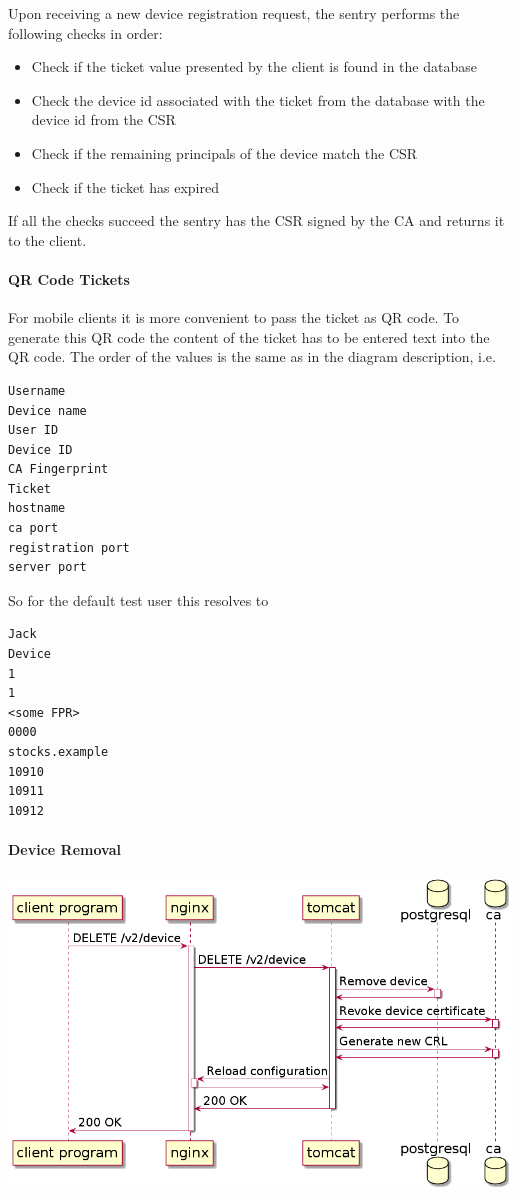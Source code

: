\documentclass{memoir}
\begin{document}
Upon receiving a new device registration request, the sentry performs the following checks in order:
\begin{itemize}
\item Check if the ticket value presented by the client is found in the database

\item Check the device id associated with the ticket from the database with the device id from the CSR

\item Check if the remaining principals of the device match the CSR

\item Check if the ticket has expired
\end{itemize}

If all the checks succeed the sentry has the CSR signed by the CA and returns it to the client.

\paragraph{QR Code Tickets}

For mobile clients it is more convenient to pass the ticket as QR code. To generate this QR code the content of the ticket has to be entered text into the QR code. The order of the values is the same as in the diagram description, i.e.

\begin{lstlisting}
Username
Device name
User ID
Device ID
CA Fingerprint
Ticket
hostname
ca port
registration port
server port
\end{lstlisting}

So for the default test user this resolves to

\begin{lstlisting}
Jack
Device
1
1
<some FPR>
0000
stocks.example
10910
10911
10912
\end{lstlisting}

\paragraph{Device Removal\\}

\includegraphics[width=\linewidth]{diagrams/remove-device.png}
\end{document}
